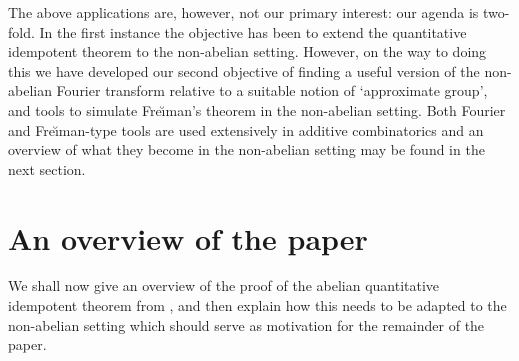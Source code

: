 \documentclass[12pt]{amsart}
\numberwithin{equation}{section}
\theoremstyle{plain}
\theoremstyle{definition}
\begin{document}
The above applications are, however, not our primary interest: our agenda is two-fold.  In the first instance the objective has been to extend the quantitative idempotent theorem to the non-abelian setting.  However, on the way to doing this we have developed our second objective of finding a useful version of the non-abelian Fourier transform relative to a suitable notion of `approximate group', and tools to simulate Fre{\u\i}man's theorem in the non-abelian setting.  Both Fourier and Fre{\u\i}man-type tools are used extensively in additive combinatorics and an overview of what they become in the non-abelian setting may be found in the next section.

\section{An overview of the paper}\label{sec.abover}

We shall now give an overview of the proof of the abelian quantitative idempotent theorem from \cite{BJGTS2}, and then explain how this needs to be adapted to the non-abelian setting which should serve as motivation for the remainder of the paper. 
\end{document}
